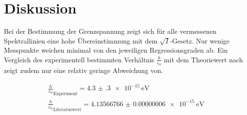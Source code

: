 \section{Diskussion}
\label{sec:Diskussion}
Bei der Bestimmung der Grenzspannung zeigt sich für alle vermessenen Spektrallinien eine hohe Übereinstimmung mit dem $\sqrt{I}$-Gesetz. Nur wenige Messpunkte weichen minimal von den jeweiligen Regressionsgraden ab.
Ein Vergleich des experimentell bestimmten Verhältnis $\frac{h}{e_0}$ mit dem Theoriewert nach \cite{c} zeigt zudem nur eine relativ geringe Abweichung von.

\begin{gather*}
  {\frac{h}{e_0}}_\mathrm{Experiment}=\SI{4.3(3)e-15}{\electronvolt}\\
  {\frac{h}{e_0}}_\mathrm{Literaturwert}=\SI{4.13566766(6)e-15}{\electronvolt}
\end{gather*}
